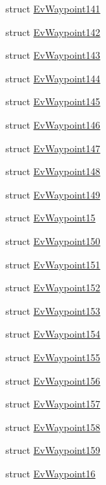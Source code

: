 \begin{DoxyCompactItemize}
struct \hyperlink{structcl__move__base__z_1_1EvWaypoint141}{Ev\+Waypoint141}
\item 
struct \hyperlink{structcl__move__base__z_1_1EvWaypoint142}{Ev\+Waypoint142}
\item 
struct \hyperlink{structcl__move__base__z_1_1EvWaypoint143}{Ev\+Waypoint143}
\item 
struct \hyperlink{structcl__move__base__z_1_1EvWaypoint144}{Ev\+Waypoint144}
\item 
struct \hyperlink{structcl__move__base__z_1_1EvWaypoint145}{Ev\+Waypoint145}
\item 
struct \hyperlink{structcl__move__base__z_1_1EvWaypoint146}{Ev\+Waypoint146}
\item 
struct \hyperlink{structcl__move__base__z_1_1EvWaypoint147}{Ev\+Waypoint147}
\item 
struct \hyperlink{structcl__move__base__z_1_1EvWaypoint148}{Ev\+Waypoint148}
\item 
struct \hyperlink{structcl__move__base__z_1_1EvWaypoint149}{Ev\+Waypoint149}
\item 
struct \hyperlink{structcl__move__base__z_1_1EvWaypoint15}{Ev\+Waypoint15}
\item 
struct \hyperlink{structcl__move__base__z_1_1EvWaypoint150}{Ev\+Waypoint150}
\item 
struct \hyperlink{structcl__move__base__z_1_1EvWaypoint151}{Ev\+Waypoint151}
\item 
struct \hyperlink{structcl__move__base__z_1_1EvWaypoint152}{Ev\+Waypoint152}
\item 
struct \hyperlink{structcl__move__base__z_1_1EvWaypoint153}{Ev\+Waypoint153}
\item 
struct \hyperlink{structcl__move__base__z_1_1EvWaypoint154}{Ev\+Waypoint154}
\item 
struct \hyperlink{structcl__move__base__z_1_1EvWaypoint155}{Ev\+Waypoint155}
\item 
struct \hyperlink{structcl__move__base__z_1_1EvWaypoint156}{Ev\+Waypoint156}
\item 
struct \hyperlink{structcl__move__base__z_1_1EvWaypoint157}{Ev\+Waypoint157}
\item 
struct \hyperlink{structcl__move__base__z_1_1EvWaypoint158}{Ev\+Waypoint158}
\item 
struct \hyperlink{structcl__move__base__z_1_1EvWaypoint159}{Ev\+Waypoint159}
\item 
struct \hyperlink{structcl__move__base__z_1_1EvWaypoint16}{Ev\+Waypoint16}
\item 

\end{DoxyCompactItemize}
